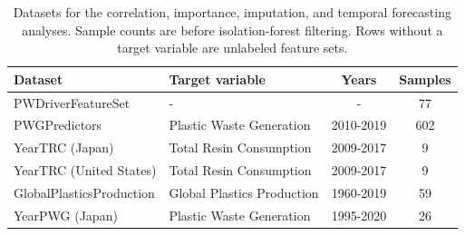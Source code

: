 \begin{table}[!ht]
	\caption{
		\centering
		Datasets for the correlation, importance, imputation, and temporal forecasting analyses. Sample counts are before isolation-forest filtering. Rows without a target variable are unlabeled feature sets.
	}
	\begin{tabular}{p{4cm} p{5cm} c c}
		\toprule
		\textbf{Dataset}         & \textbf{Target variable}   & \textbf{Years} & \textbf{Samples} \\
		\midrule
		PWDriverFeatureSet       & -                          & -              & 77               \\
		PWGPredictors            & Plastic Waste Generation   & 2010-2019      & 602              \\
		YearTRC (Japan)          & Total Resin Consumption    & 2009-2017      & 9                \\
		YearTRC (United States)  & Total Resin Consumption    & 2009-2017      & 9                \\
		GlobalPlasticsProduction & Global Plastics Production & 1960-2019      & 59               \\
		YearPWG (Japan)          & Plastic Waste Generation   & 1995-2020      & 26               \\
		\bottomrule
	\end{tabular}
	\label{tab:datasets}
\end{table}
